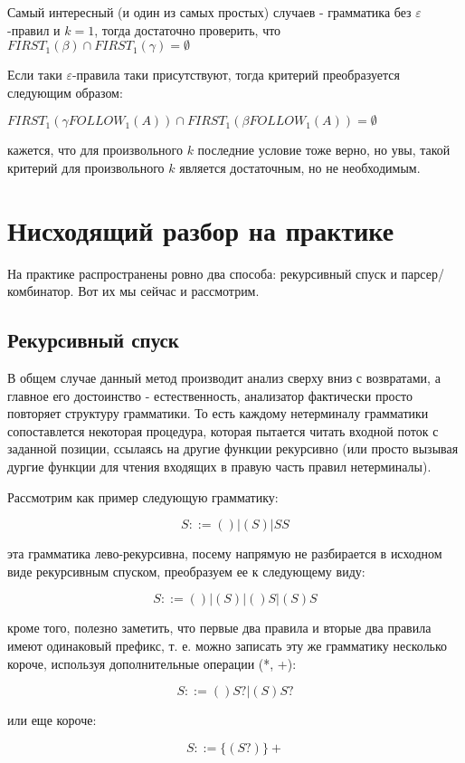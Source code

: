 Самый интересный (и один из самых простых) случаев - грамматика без $\varepsilon$-правил и $k = 1$, тогда
достаточно проверить, что $FIRST_1(\beta) \cap FIRST_1(\gamma) = \emptyset$

Если таки $\varepsilon$-правила таки присутствуют, тогда критерий преобразуется следующим образом:

$FIRST_1(\gamma FOLLOW_1(A)) \cap FIRST_1(\beta FOLLOW_1(A)) = \emptyset$

кажется, что для произвольного $k$ последние условие тоже верно, но увы, такой критерий для произвольного $k$
является достаточным, но не необходимым.

\section{Нисходящий разбор на практике}

На практике распространены ровно два способа: рекурсивный спуск и парсер/комбинатор. Вот их мы сейчас и рассмотрим.

\subsection{Рекурсивный спуск}

В общем случае данный метод производит анализ сверху вниз с возвратами, а главное его достоинство - естественность, анализатор фактически просто повторяет структуру грамматики. То есть каждому нетерминалу
грамматики сопоставлется некоторая процедура, которая пытается читать входной поток с заданной позиции, ссылаясь
на другие функции рекурсивно (или просто вызывая дургие функции для чтения входящих в правую часть правил 
нетерминалы).

Рассмотрим как пример следующую грамматику:

$$ S ::= () | (S) | SS $$

эта грамматика лево-рекурсивна, посему напрямую не разбирается в исходном виде рекурсивным спуском, преобразуем
ее к следующему виду:

$$ S ::= () | (S) | ()S | (S)S $$

кроме того, полезно заметить, что первые два правила и вторые два правила имеют одинаковый префикс, т. е.
можно записать эту же грамматику несколько короче, используя дополнительные операции (*, +):

$$ S ::= ()S? | (S)S? $$

или еще короче:

$$ S ::= \lbrace(S?)\rbrace+ $$
